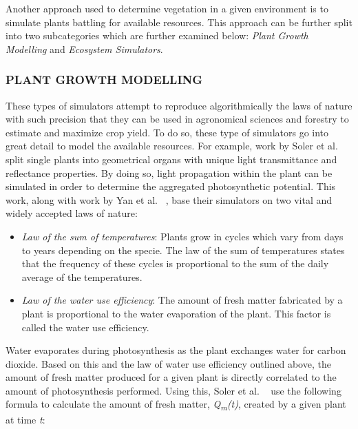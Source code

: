 Another approach used to determine vegetation in a given environment is to simulate plants battling for available resources. This approach can be further split into two subcategories which are further examined below: \textit{Plant Growth Modelling} and \textit{Ecosystem Simulators}.\\

\subsubsection{PLANT GROWTH MODELLING}

These types of simulators attempt to reproduce algorithmically the laws of nature with such precision that they can be used in agronomical sciences and forestry to estimate and maximize crop yield. To do so, these type of simulators go into great detail to model the available resources. For example,  work by Soler et al. ~\cite{Soler2001} split single plants into geometrical organs with unique light transmittance and reflectance properties. By doing so, light propagation within the plant can be simulated in order to determine the aggregated photosynthetic potential. This work, along with work by Yan et al. ~\cite{Yan2004}, base their simulators on two vital and widely accepted laws of nature:

\begin{itemize}
\item \textit{Law of the sum of temperatures}: Plants grow in cycles which vary from days to years depending on the specie. The law of the sum of temperatures states that the frequency of these cycles is proportional to the sum of the daily average of the temperatures.
\item \textit{Law of the water use efficiency}: The amount of fresh matter fabricated by a plant is proportional to the water evaporation of the plant. This factor is called the water use efficiency. 
\end{itemize}

Water evaporates during photosynthesis as the plant exchanges water for carbon dioxide. Based on this and the law of water use efficiency outlined above, the amount of fresh matter produced for a given plant is directly correlated to the amount of photosynthesis performed. Using this, Soler et al. ~\cite{Soler2001} use the following formula to calculate the amount of fresh matter, \textit{Q\textsubscript{m}(t)}, created by a given plant at time \textit{t}:\\

